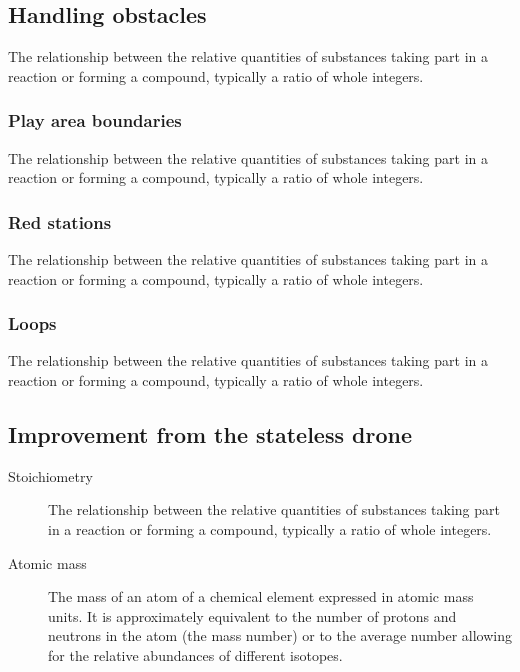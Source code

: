 \documentclass{article}
\begin{document}
\subsection{Handling obstacles}
\label{Class Relationships}
\begin{description}
The relationship between the relative quantities of substances taking part in a reaction or forming a compound, typically a ratio of whole integers.
\end{description} 


\subsubsection{Play area boundaries}
\begin{description}
The relationship between the relative quantities of substances taking part in a reaction or forming a compound, typically a ratio of whole integers.
\end{description} 

\subsubsection{Red stations}
\begin{description}
The relationship between the relative quantities of substances taking part in a reaction or forming a compound, typically a ratio of whole integers.
\end{description} 

\subsubsection{Loops}
\begin{description}
The relationship between the relative quantities of substances taking part in a reaction or forming a compound, typically a ratio of whole integers.
\end{description} 


\subsection{Improvement from the stateless drone}
\label{Class Relationships}
\begin{description}
\item[Stoichiometry]
The relationship between the relative quantities of substances taking part in a reaction or forming a compound, typically a ratio of whole integers.
\item[Atomic mass]
The mass of an atom of a chemical element expressed in atomic mass units. It is approximately equivalent to the number of protons and neutrons in the atom (the mass number) or to the average number allowing for the relative abundances of different isotopes. 
\end{description} 
\end{document}
